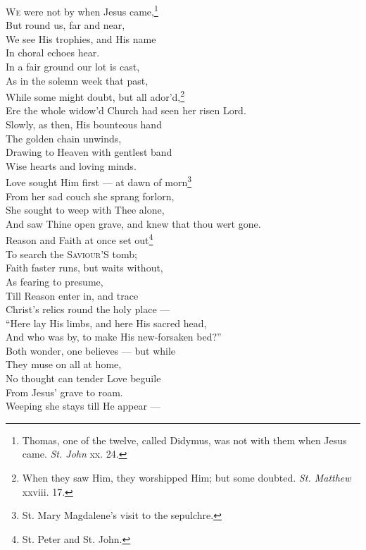 \textsc{We} were not by when Jesus came,\footnote{Thomas, one of the twelve, called Didymus, was not with them when Jesus came. \emph{St. John} xx. 24.} \\
 But round us, far and near, \\
 We see His trophies, and His name \\
 In choral echoes hear. \\
 In a fair ground our lot is cast, \\
 As in the solemn week that past, \\
 While some might doubt, but all ador’d,\footnote{When they saw Him, they worshipped Him; but some doubted. \emph{St. Matthew} xxviii. 17.} \\
 Ere the whole widow’d Church had seen her risen Lord. \\
  Slowly, as then, His bounteous hand \\
 The golden chain unwinds, \\
 Drawing to Heaven with gentlest band \\
 Wise hearts and loving minds. \\
 Love sought Him first — at dawn of morn\footnote{St. Mary Magdalene’s visit to the sepulchre.} \\
 From her sad couch she sprang forlorn, \\
 She sought to weep with Thee alone, \\
 And saw Thine open grave, and knew that thou wert gone. \\
  Reason and Faith at once set out\footnote{St. Peter and St. John.} \\
 To search the \textsc{Saviour’S} tomb; \\
 Faith faster runs, but waits without, \\
 As fearing to presume, \\
 Till Reason enter in, and trace \\
 Christ’s relics round the holy place — \\
 “Here lay His limbs, and here His sacred head, \\
 And who was by, to make His new-forsaken bed?” \\
  Both wonder, one believes — but while \\
 They muse on all at home, \\
 No thought can tender Love beguile \\
 From Jesus’ grave to roam. \\
 Weeping she stays till He appear — \\
